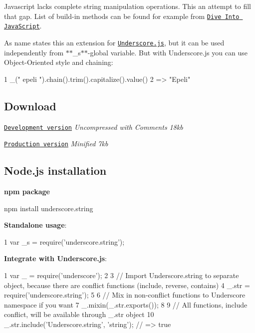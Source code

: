 Javascript lacks complete string manipulation operations. This an attempt to fill that gap. List of build-\/in methods can be found for example from \href{http://www.diveintojavascript.com/core-javascript-reference/the-string-object}{\tt Dive Into Java\+Script}.

As name states this an extension for \href{http://documentcloud.github.com/underscore/}{\tt Underscore.\+js}, but it can be used independently from $\ast$$\ast$\+\_\+s$\ast$$\ast$-\/global variable. But with Underscore.\+js you can use Object-\/\+Oriented style and chaining\+:


\begin{DoxyCode}
1 \_("   epeli  ").chain().trim().capitalize().value()
2 => "Epeli"
\end{DoxyCode}


\subsection*{Download}


\begin{DoxyItemize}
\item \href{https://raw.github.com/epeli/underscore.string/master/lib/underscore.string.js}{\tt Development version} {\itshape Uncompressed with Comments 18kb}
\item \href{https://github.com/epeli/underscore.string/raw/master/dist/underscore.string.min.js}{\tt Production version} {\itshape Minified 7kb}
\end{DoxyItemize}

\subsection*{Node.\+js installation}

{\bfseries npm package} \begin{DoxyVerb}npm install underscore.string
\end{DoxyVerb}


{\bfseries Standalone usage}\+:


\begin{DoxyCode}
1 var \_s = require('underscore.string');
\end{DoxyCode}


{\bfseries Integrate with Underscore.\+js}\+:


\begin{DoxyCode}
1 var \_  = require('underscore');
2 
3 // Import Underscore.string to separate object, because there are conflict functions (include, reverse,
       contains)
4 \_.str = require('underscore.string');
5 
6 // Mix in non-conflict functions to Underscore namespace if you want
7 \_.mixin(\_.str.exports());
8 
9 // All functions, include conflict, will be available through \_.str object
10 \_.str.include('Underscore.string', 'string'); // => true
\end{DoxyCode}


